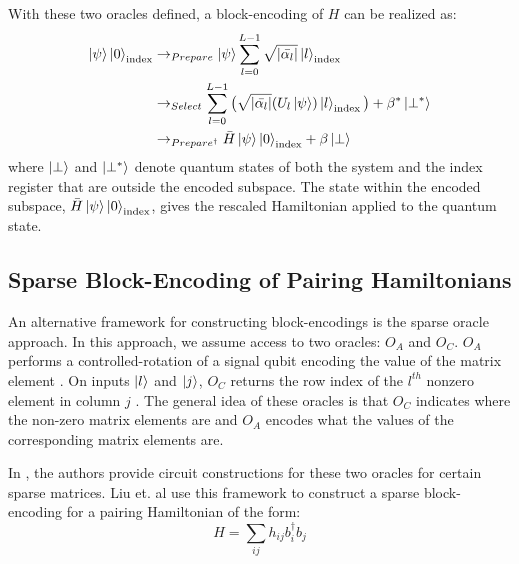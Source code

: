 With these two oracles defined, a block-encoding of $H$ can be realized as:
\begin{equation}
    \begin{split}
        \ket{\psi} \ket{0}_{\text{\text{index}}} &\rightarrow_{Prepare} \ket{\psi} \sum_{l=0}^{L-1} \sqrt{| \bar{\alpha_l} |} \ket{l}_{\text{\text{index}}} \\
        &\rightarrow_{Select} \sum_{l=0}^{L-1} \big(\sqrt{| \bar{\alpha_l} |} (U_l \ket{\psi}) \ket{l}_{\text{\text{index}}} \big) + \beta^* \ket{\perp^*} \\
        &\rightarrow_{Prepare^\dagger}  \bar{H} \ket{\psi} \ket{0}_{\text{\text{index}}} + \beta \ket{\perp} \\
    \end{split}
\end{equation}
where $\ket{\perp}$ and $\ket{\perp^*}$ denote quantum states of both the system and the index register that are outside the encoded subspace.
The state within the encoded subspace, $\bar{H} \ket{\psi} \ket{0}_{\text{\text{index}}}$, gives the rescaled Hamiltonian applied to the quantum state.

\subsection{Sparse Block-Encoding of Pairing Hamiltonians}
\label{subsec:sparse-be}

An alternative framework for constructing block-encodings is the sparse oracle approach.
In this approach, we assume access to two oracles: $O_A$ and $O_C$.
$O_A$ performs a controlled-rotation of a signal qubit encoding the value of the matrix element \cite{lin2022lecture} .
On inputs $\ket{l}$ and $\ket{j}$, $O_C$ returns the row index of the $l^{th}$ nonzero element in column $j$ \cite{camps2024explicit}.
The general idea of these oracles is that $O_C$ indicates where the non-zero matrix elements are and $O_A$ encodes what the values of the corresponding matrix elements are. 

In \cite{camps2024explicit}, the authors provide circuit constructions for these two oracles for certain sparse matrices.
Liu et. al \cite{liu2024efficient} use this framework to construct a sparse block-encoding for a pairing Hamiltonian of the form:
\begin{equation}
    H = \sum_{ij}h_{ij}b^\dagger_i b_j
\end{equation}

